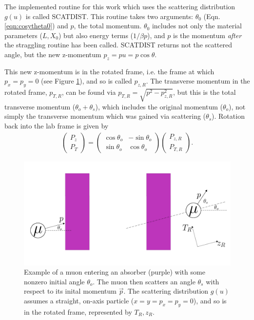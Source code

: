 The implemented routine for this work which uses the scattering distribution $g(u)$ is called SCATDIST. This routine takes two arguments: $\theta_0$ (Eqn. \ref{eqn:cosytheta0}) and $p$, the total momentum. $\theta_0$ includes not only the material parameters ($L, X_0$) but also energy terms ($1/\beta p$), and $p$ is the momentum \textit{after} the straggling routine has been called. SCATDIST returns not the scattered angle, but the new z-momentum $p_z=pu=p\cos\theta$. 

This new z-momentum is in the rotated frame, i.e. the frame at which $p_x=p_y=0$ (see Figure \ref{fig:cosyRotatedFrame}), and so is called $p_{z,R}$. The transverse momentum in the rotated frame, $p_{T,R}$, can be found via $p_{T,R}=\sqrt{p^2-p_{z,R}^2}$, but this is the total transverse momentum ($\theta_o + \theta_s$), which includes the original momentum ($\theta_o$), not simply the transverse momentum which was gained via scattering ($\theta_s$). Rotation back into the lab frame is given by
\begin{align*}
\begin{pmatrix}
P_{z} \\ P_T
\end{pmatrix}
=
\begin{pmatrix}
\cos\theta_o & -\sin\theta_o\\
\sin\theta_o & \cos\theta_o
\end{pmatrix}
\begin{pmatrix}
P_{z,R} \\ P_{T,R}
\end{pmatrix}.
\end{align*}

\begin{figure}
  \centering
    \includegraphics[width=\textwidth]{Figures/cosyRotatedFrame} 
  \caption[Example of a muon entering an absorber with some nonzero initial angle.]{Example of a muon entering an absorber (purple) with some nonzero initial angle $\theta_o$. The muon then scatters an angle $\theta_s$ with respect to its inital momentum $\vec{p}$. The scattering distribution $g(u)$ assumes a straight, on-axis particle ($x=y=p_x=p_y=0$), and so is in the rotated frame, represented by $T_R, z_R$.}
  \label{fig:cosyRotatedFrame}
\end{figure}


